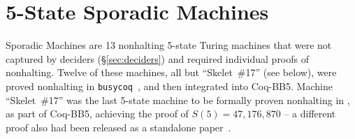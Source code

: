 \documentclass[sigconf,screen]{acmart}
\theoremstyle{definition} %
\numberwithin{equation}{section}
\theoremstyle{definition} %
\newcommand{\BBtheFifth}{47{,}176{,}870}
\newcommand{\numSporadic}{13\xspace}
\newcommand{\CoqBB}{Coq-BB5\xspace}
\begin{document}
\section{5-State Sporadic Machines}\label{sec:sporadic}

Sporadic Machines are \numSporadic nonhalting 5-state Turing machines that were not captured by deciders (\S\ref{sec:deciders}) and required individual \Coq proofs of nonhalting. Twelve of these machines, \ie all but ``Skelet~\#17'' (see below), were proved nonhalting in \texttt{busycoq}~\cite{busycoq}, and then integrated into \CoqBB. Machine ``Skelet~\#17'' was the last 5-state machine to be formally proven nonhalting in \Coq, as part of \CoqBB, achieving the proof of $S(5) = \BBtheFifth$ -- a different proof also had been released as a standalone paper~\cite{xu2024skelet17fifthbusy}.
\end{document}
